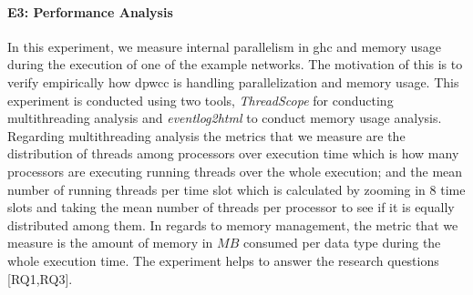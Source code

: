 \paragraph{E3: Performance Analysis}
In this experiment, we measure internal parallelism in \acrshort{ghc} and memory usage during the execution of one of the example networks. The motivation of this is to verify empirically how \acrshort{dpwcc} is handling parallelization and memory usage. This experiment is conducted using two tools, \textit{ThreadScope} \cite{threadscope} for conducting multithreading analysis and \textit{eventlog2html} \cite{eventlog2html} to conduct memory usage analysis. Regarding multithreading analysis the metrics that we measure are the distribution of threads among processors over execution time which is how many processors are executing running threads over the whole execution; and the mean number of running threads per time slot which is calculated by zooming in $8$ time slots and taking the mean number of threads per processor to see if it is equally distributed among them. In regards to memory management, the metric that we measure is the amount of memory in $MB$ consumed per data type during the whole execution time. The experiment helps to answer the research questions [RQ1,RQ3].

